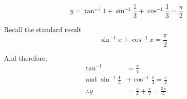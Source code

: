 \documentclass[14pt,fleqn]{extarticle}
\newcommand\third{\frac{1}{3}}
\begin{document}
 
\begin{snippet}
    
    
    \incorrect
    
    \[ y = \tan^{-1} 1 + \sin^{-1}\third + \cos^{-1}\third = \frac\pi{2} \]
    
    \reason
    
    Recall the standard result 
    \[ \qquad \sin^{-1} x + \cos^{-1} x = \frac\pi{2} \]
    
    And therefore, 
    \begin{align}
	\tan^{-1} &= \frac\pi{4} \\
	\text{and } \sin^{-1} \third &+ \cos^{-1}\third = \frac\pi{2} \\
	\therefore y &= \frac\pi{4} + \frac\pi{2} = \frac{3\pi}{4} 
\end{align}
    
\end{snippet} 
\end{document}
